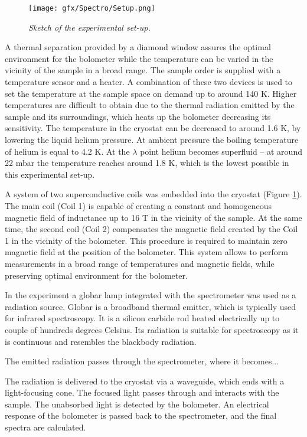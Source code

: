 \documentclass[titlepage,a4paper]{book}
\begin{document}
\begin{figure}[ht]
	\centering
	\texttt{[image: gfx/Spectro/Setup.png]}
	\vspace{-10pt}
	\caption{\textit{Sketch of the experimental set-up.}}
	\label{fig:Experimental_setup}
\end{figure}

A thermal separation provided by a diamond window assures the optimal environment for the bolometer while the temperature can be varied in the vicinity of the sample in a broad range. The sample order is supplied with a temperature sensor and a heater. A combination of these two devices is used to set the temperature at the sample space on demand up to around 140 K. Higher temperatures are difficult to obtain due to the thermal radiation emitted by the sample and its surroundings, which heats up the bolometer decreasing its sensitivity. The temperature in the cryostat can be decreased to around 1.6 K, by lowering the liquid helium pressure. At ambient pressure the boiling temperature of helium is equal to 4.2 K. At the $\lambda$ point helium becomes superfluid -- at around 22 mbar the temperature reaches around 1.8 K, which is the lowest possible in this experimental set-up.

A system of two superconductive coils was embedded into the cryostat (Figure \ref{fig:Experimental_setup}). The main coil (Coil 1) is capable of creating a constant and homogeneous magnetic field of inductance up to 16 T in the vicinity of the sample. At the same time, the second coil (Coil 2) compensates the magnetic field created by the Coil 1 in the vicinity of the bolometer. This procedure is required to maintain zero magnetic field at the position of the bolometer. This system allows to perform measurements in a broad range of temperatures and magnetic fields, while preserving optimal environment for the bolometer.

In the experiment a globar lamp integrated with the spectrometer was used as a radiation source. Globar is a broadband thermal emitter, which is typically used for infrared spectroscopy. It is a silicon carbide rod heated electrically up to couple of hundreds degrees Celsius. Its radiation is suitable for spectroscopy as it is continuous and resembles the blackbody radiation.

The emitted radiation passes through the spectrometer, where it becomes...


The radiation is delivered to the cryostat via a waveguide, which ends with a light-focusing cone. The focused light passes through and interacts with the sample. The unabsorbed light is detected by the bolometer. An electrical response of the bolometer is passed back to the spectrometer, and the final spectra are calculated.
\end{document}
